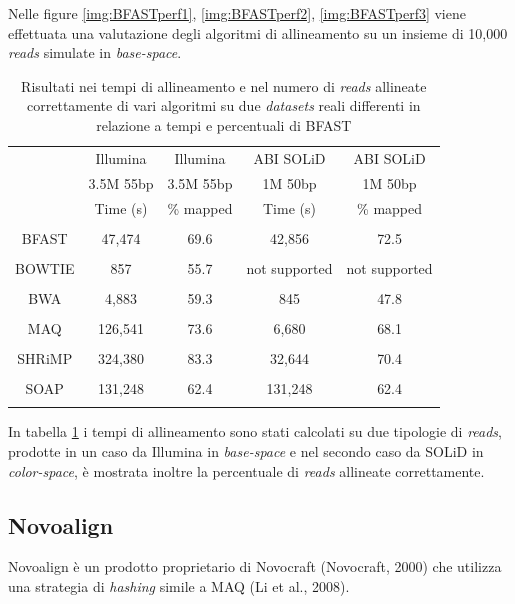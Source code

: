 \documentclass[conference]{IEEEtran}
\begin{document}
Nelle figure \ref{img:BFASTperf1}, \ref{img:BFASTperf2}, \ref{img:BFASTperf3} viene effettuata una valutazione degli algoritmi di allineamento su un insieme di 10,000 \textit{reads} simulate in \textit{base-space}.\\

\begin{table}
\begin{center}
\begin{tabular}{|c|c|c|c|c|}
& Illumina & Illumina & ABI SOLiD & ABI SOLiD \\
& 3.5M 55bp & 3.5M 55bp & 1M 50bp & 1M 50bp \\
& Time (s) & \% mapped & Time (s) & \% mapped \\
\hline{}
&&&&\\
BFAST & 47,474 & 69.6 & 42,856 & 72.5 \\
&&&&\\
BOWTIE & 857 & 55.7 & not supported & not supported \\
&&&&\\
BWA & 4,883 & 59.3 & 845 & 47.8 \\
&&&&\\
MAQ & 126,541 & 73.6 & 6,680 & 68.1 \\
&&&&\\
SHRiMP & 324,380 & 83.3 & 32,644 & 70.4 \\
&&&&\\
SOAP & 131,248 & 62.4 & 131,248 & 62.4 \\
&&&&\\
\end{tabular}
\end{center}
\caption{Risultati nei tempi di allineamento e nel numero di \textit{reads} allineate correttamente di vari algoritmi su due \textit{datasets} reali differenti in relazione a tempi e percentuali di BFAST}
\label{tab:BFASTperf4}

\end{table}

In tabella \ref{tab:BFASTperf4} i tempi di allineamento sono stati calcolati su due tipologie di \textit{reads}, prodotte in un caso da Illumina in \textit{base-space} e nel secondo caso da SOLiD in \textit{color-space}, è mostrata inoltre la percentuale di \textit{reads} allineate correttamente.

	\subsection{Novoalign}
	Novoalign è un prodotto proprietario di Novocraft (Novocraft, 2000) che utilizza una strategia di \textit{hashing} simile a MAQ (Li et al., 2008).\\
\end{document}
